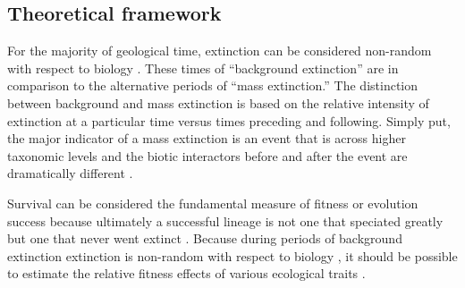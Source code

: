 \documentclass[12pt,letterpaper]{article}
\begin{document}


\subsection{Theoretical framework}
For the majority of geological time, extinction can be considered non-random with respect to biology \citep{Jablonski1986}. These times of ``background extinction'' are in comparison to the alternative periods of ``mass extinction.'' The distinction between background and mass extinction is based on the relative intensity of extinction at a particular time versus times preceding and following. Simply put, the major indicator of a mass extinction is an event that is across higher taxonomic levels and the biotic interactors before and after the event are dramatically different \citep{Jablonski1986,Jablonski2005,Kitchell1986,Kitchell1991}.

Survival can be considered the fundamental measure of fitness or evolution success because ultimately a successful lineage is not one that speciated greatly but one that never went extinct \citep{Cooper1984,Palmer2012}. Because during periods of background extinction extinction is non-random with respect to biology \citep{Jablonski1986}, it should be possible to estimate the relative fitness effects of various ecological traits \citep{Kitchell1990,Kitchell1985a}. 
\end{document}
